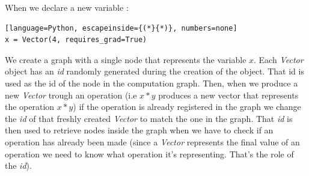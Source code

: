 \documentclass[12pt]{article}
\begin{document}
When we declare a new variable :

\begin{lstlisting}[language=Python, escapeinside={(*}{*)}, numbers=none]
x = Vector(4, requires_grad=True)
\end{lstlisting}

We create a graph with a single node that represents the variable $x$. Each {\it Vector}  object has an {\it id} randomly generated during the creation of the object. That id is used as the id of the node in the computation graph. Then, when we produce a new {\it Vector} trough an operation (i.e $x*y$ produces a new vector that represents the operation $x*y$) if the operation is already registered in the graph we change the {\it id} of that freshly created {\it Vector} to match the one in the graph. That {\it id} is then used to retrieve nodes inside the graph when we have to check if an operation has already been made (since a {\it Vector} represents the final value of an operation we need to know what operation it's representing. That's the role of the {\it id}).




\end{document}

